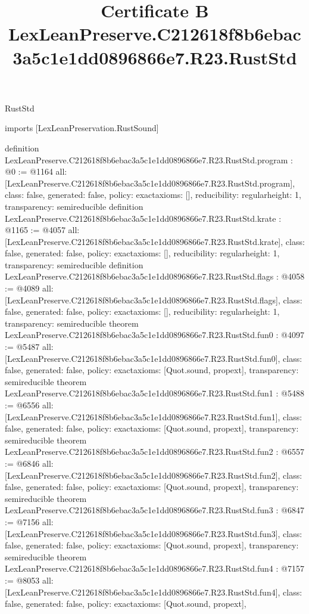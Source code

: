 \begin{lexlean}{RustStd}
\title{Certificate B LexLeanPreserve.C212618f8b6ebac3a5c1e1dd0896866e7.R23.RustStd}
\begin{coremodule}
imports [LexLeanPreservation.RustSound]

definition LexLeanPreserve.C212618f8b6ebac3a5c1e1dd0896866e7.R23.RustStd.program : @0 := @1164 {
  all: [LexLeanPreserve.C212618f8b6ebac3a5c1e1dd0896866e7.R23.RustStd.program],
  class: false,
  generated: false,
  policy: exact{axioms: []},
  reducibility: regular{height: 1},
  transparency: semireducible
}
definition LexLeanPreserve.C212618f8b6ebac3a5c1e1dd0896866e7.R23.RustStd.krate : @1165 := @4057 {
  all: [LexLeanPreserve.C212618f8b6ebac3a5c1e1dd0896866e7.R23.RustStd.krate],
  class: false,
  generated: false,
  policy: exact{axioms: []},
  reducibility: regular{height: 1},
  transparency: semireducible
}
definition LexLeanPreserve.C212618f8b6ebac3a5c1e1dd0896866e7.R23.RustStd.flags : @4058 := @4089 {
  all: [LexLeanPreserve.C212618f8b6ebac3a5c1e1dd0896866e7.R23.RustStd.flags],
  class: false,
  generated: false,
  policy: exact{axioms: []},
  reducibility: regular{height: 1},
  transparency: semireducible
}
theorem LexLeanPreserve.C212618f8b6ebac3a5c1e1dd0896866e7.R23.RustStd.fun0 : @4097 := @5487 {
  all: [LexLeanPreserve.C212618f8b6ebac3a5c1e1dd0896866e7.R23.RustStd.fun0],
  class: false,
  generated: false,
  policy: exact{axioms: [Quot.sound, propext]},
  transparency: semireducible
}
theorem LexLeanPreserve.C212618f8b6ebac3a5c1e1dd0896866e7.R23.RustStd.fun1 : @5488 := @6556 {
  all: [LexLeanPreserve.C212618f8b6ebac3a5c1e1dd0896866e7.R23.RustStd.fun1],
  class: false,
  generated: false,
  policy: exact{axioms: [Quot.sound, propext]},
  transparency: semireducible
}
theorem LexLeanPreserve.C212618f8b6ebac3a5c1e1dd0896866e7.R23.RustStd.fun2 : @6557 := @6846 {
  all: [LexLeanPreserve.C212618f8b6ebac3a5c1e1dd0896866e7.R23.RustStd.fun2],
  class: false,
  generated: false,
  policy: exact{axioms: [Quot.sound, propext]},
  transparency: semireducible
}
theorem LexLeanPreserve.C212618f8b6ebac3a5c1e1dd0896866e7.R23.RustStd.fun3 : @6847 := @7156 {
  all: [LexLeanPreserve.C212618f8b6ebac3a5c1e1dd0896866e7.R23.RustStd.fun3],
  class: false,
  generated: false,
  policy: exact{axioms: [Quot.sound, propext]},
  transparency: semireducible
}
theorem LexLeanPreserve.C212618f8b6ebac3a5c1e1dd0896866e7.R23.RustStd.fun4 : @7157 := @8053 {
  all: [LexLeanPreserve.C212618f8b6ebac3a5c1e1dd0896866e7.R23.RustStd.fun4],
  class: false,
  generated: false,
  policy: exact{axioms: [Quot.sound, propext]},
}
\end{coremodule}
\end{lexlean}
